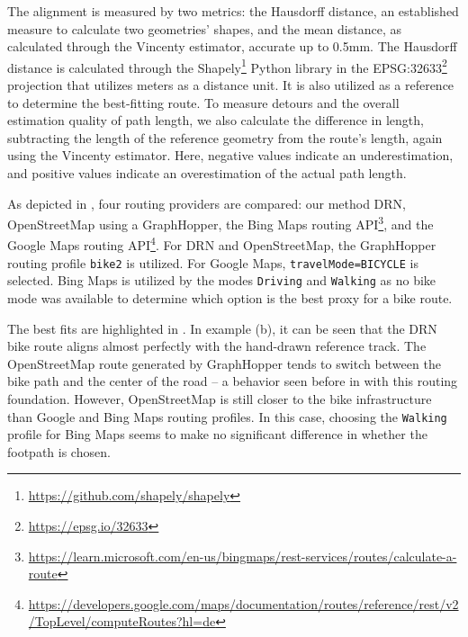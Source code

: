 The alignment is measured by two metrics: the Hausdorff distance, an established measure to calculate two geometries' shapes, and the mean distance, as calculated through the Vincenty estimator, accurate up to 0.5mm. The Hausdorff distance is calculated through the Shapely\footnote{\url{https://github.com/shapely/shapely}} Python library in the EPSG:32633\footnote{\url{https://epsg.io/32633}} projection that utilizes meters as a distance unit. It is also utilized as a reference to determine the best-fitting route. To measure detours and the overall estimation quality of path length, we also calculate the difference in length, subtracting the length of the reference geometry from the route's length, again using the Vincenty estimator. Here, negative values indicate an underestimation, and positive values indicate an overestimation of the actual path length.

As depicted in , four routing providers are compared: our method DRN, OpenStreetMap using a GraphHopper, the Bing Maps routing API\footnote{\url{https://learn.microsoft.com/en-us/bingmaps/rest-services/routes/calculate-a-route}}, and the Google Maps routing API\footnote{\url{https://developers.google.com/maps/documentation/routes/reference/rest/v2/TopLevel/computeRoutes?hl=de}}. For DRN and OpenStreetMap, the GraphHopper routing profile \texttt{bike2} is utilized. For Google Maps, \texttt{travelMode=\allowbreak BICYCLE} is selected. Bing Maps is utilized by the modes \texttt{Driving} and \texttt{Walking} as no bike mode was available to determine which option is the best proxy for a bike route.

The best fits are highlighted in . In example (b), it can be seen that the DRN bike route aligns almost perfectly with the hand-drawn reference track. The OpenStreetMap route generated by GraphHopper tends to switch between the bike path and the center of the road -- a behavior seen before in  with this routing foundation. However, OpenStreetMap is still closer to the bike infrastructure than Google and Bing Maps routing profiles. In this case, choosing the \texttt{Walking} profile for Bing Maps seems to make no significant difference in whether the footpath is chosen.

